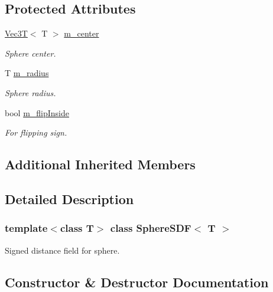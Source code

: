 \subsection*{Protected Attributes}
\begin{DoxyCompactItemize}
\item 
\mbox{\label{classSphereSDF_ab3caacb26a72b3ada01f09a248f5cb83}} 
\hyperlink{classVec3T}{Vec3T}$<$ T $>$ \hyperlink{classSphereSDF_ab3caacb26a72b3ada01f09a248f5cb83}{m\+\_\+center}
\begin{DoxyCompactList}\small\item\em Sphere center. \end{DoxyCompactList}\item 
\mbox{\label{classSphereSDF_ac4b0f786ea2b53530512ce3fa4e7bdbd}} 
T \hyperlink{classSphereSDF_ac4b0f786ea2b53530512ce3fa4e7bdbd}{m\+\_\+radius}
\begin{DoxyCompactList}\small\item\em Sphere radius. \end{DoxyCompactList}\item 
\mbox{\label{classSphereSDF_a9a32a668648c166b41c5d1c3981c9579}} 
bool \hyperlink{classSphereSDF_a9a32a668648c166b41c5d1c3981c9579}{m\+\_\+flip\+Inside}
\begin{DoxyCompactList}\small\item\em For flipping sign. \end{DoxyCompactList}\end{DoxyCompactItemize}
\subsection*{Additional Inherited Members}


\subsection{Detailed Description}
\subsubsection*{template$<$class T$>$\newline
class Sphere\+S\+D\+F$<$ T $>$}

Signed distance field for sphere. 

\subsection{Constructor \& Destructor Documentation}
\mbox{\label{classSphereSDF_a3e555062b1b20c1729a9f4ab6136add4}} 
